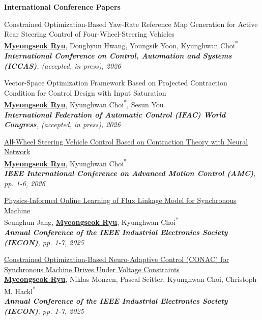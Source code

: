 \footnotesize{\textbf{International Conference Papers}

\begin{etaremune}

    \item {
        Constrained Optimization-Based Yaw-Rate Reference Map Generation for Active Rear Steering Control of Four-Wheel-Steering Vehicles
        \\
        \textbf{\underline{Myeongseok Ryu}}, Donghyun Hwang, Youngsik Yoon, Kyunghwan Choi\textsuperscript{{*}}
        \\
        \textit{
            \textbf{International Conference on Control, Automation and Systems (ICCAS)}, (accepted, in press), 2026
        }
    }

    \item {
        Vector-Space Optimization Framework Based on Projected Contraction Condition for Control Design with Input Saturation
        \\
        \textbf{\underline{Myeongseok Ryu}}, Kyunghwan Choi\textsuperscript{{*}}, Sesun You
        \\
        \textit{
            \textbf{International Federation of Automatic Control (IFAC) World Congress}, (accepted, in press), 2026
        }
    }

    \item {
        \href{https://doi.org/10.1109/AMC67705.2026.11435819}{All-Wheel Steering Vehicle Control Based on Contraction Theory with Neural Network}
        \\
        \textbf{\underline{Myeongseok Ryu}}, Kyunghwan Choi\textsuperscript{{*}}
        \\
        \textit{
            \textbf{IEEE International Conference on Advanced Motion Control (AMC)}, pp. 1-6, 2026
        }
    }

    \item {
        \href{https://doi.org/10.1109/IECON58223.2025.11221587}{Physics-Informed Online Learning of Flux Linkage Model for Synchronous Machine}
        \\
        Seunghun Jang, \textbf{\underline{Myeongseok Ryu}}, Kyunghwan Choi\textsuperscript{{*}}
        \\
        \textit{
            \textbf{Annual Conference of the IEEE Industrial Electronics Society (IECON)}, pp. 1-7, 2025
        }
    }

    \item {
        \href{https://doi.org/10.1109/IECON58223.2025.11221692}{Constrained Optimization-Based Neuro-Adaptive Control (CONAC) for Synchronous Machine Drives Under Voltage Constraints}
        \\
        \textbf{\underline{Myeongseok Ryu}}, Niklas Monzen, Pascal Seitter, Kyunghwan Choi, Christoph M. Hackl\textsuperscript{{*}}
        \\
        \textit{
            \textbf{Annual Conference of the IEEE Industrial Electronics Society (IECON)}, pp. 1-7, 2025
        }
    }


\end{etaremune}}
